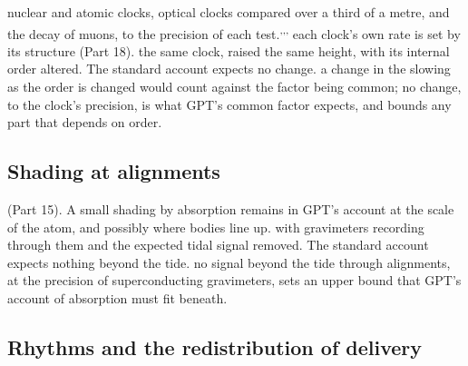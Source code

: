  nuclear and atomic clocks, optical clocks compared over a third of a metre, and the decay of muons, to the precision of each test.\textsuperscript{,}\textsuperscript{,}\textsuperscript{,}  each clock's own rate is set by its structure (Part 18).  the same clock, raised the same height, with its internal order altered. The standard account expects no change.  a change in the slowing as the order is changed would count against the factor being common; no change, to the clock's precision, is what GPT's common factor expects, and bounds any part that depends on order.

\subsection{Shading at alignments}\label{sec:alignments}

 (Part 15). A small shading by absorption remains in GPT's account at the scale of the atom, and possibly where bodies line up.  with gravimeters recording through them and the expected tidal signal removed. The standard account expects nothing beyond the tide.  no signal beyond the tide through alignments, at the precision of superconducting gravimeters, sets an upper bound that GPT's account of absorption must fit beneath.

\subsection{Rhythms and the redistribution of delivery}\label{sec:rhythms}

